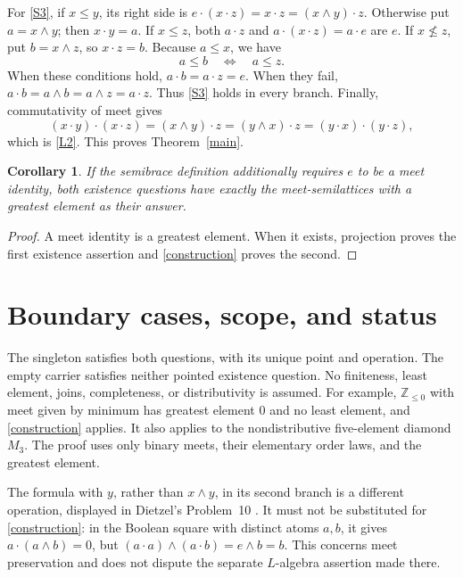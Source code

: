 \documentclass[11pt]{article}
\newtheorem{corollary}[theorem]{Corollary}
\newcommand{\meet}{\wedge}
\newcommand{\dotop}{\mathbin{\cdot}}
\begin{document}
For \eqref{S3}, if \(x\leq y\), its right side is
\(e\dotop(x\dotop z)=x\dotop z=(x\meet y)\dotop z\).
Otherwise put \(a=x\meet y\); then \(x\dotop y=a\).
If \(x\leq z\), both \(a\dotop z\) and \(a\dotop(x\dotop z)=a\dotop e\)
are \(e\). If \(x\not\leq z\), put \(b=x\meet z\), so \(x\dotop z=b\).
Because \(a\leq x\), we have
\[
a\leq b\quad\Longleftrightarrow\quad a\leq z.
\]
When these conditions hold, \(a\dotop b=a\dotop z=e\).
When they fail, \(a\dotop b=a\meet b=a\meet z=a\dotop z\).
Thus \eqref{S3} holds in every branch. Finally, commutativity of meet gives
\[
(x\dotop y)\dotop(x\dotop z)
=(x\meet y)\dotop z
=(y\meet x)\dotop z
=(y\dotop x)\dotop(y\dotop z),
\]
which is \eqref{L2}. This proves Theorem~\ref{main}.

\begin{corollary}
If the semibrace definition additionally requires \(e\) to be a meet
identity, both existence questions have exactly the meet-semilattices with
a greatest element as their answer.
\end{corollary}
\begin{proof}
A meet identity is a greatest element. When it exists, projection proves
the first existence assertion and \eqref{construction} proves the second.
\end{proof}

\section{Boundary cases, scope, and status}

The singleton satisfies both questions, with its unique point and operation.
The empty carrier satisfies neither pointed existence question.
No finiteness, least element, joins, completeness, or distributivity is
assumed. For example, \(\mathbb Z_{\leq0}\) with meet given by minimum has
greatest element \(0\) and no least element, and \eqref{construction}
applies. It also applies to the nondistributive five-element diamond
\(M_3\). The proof uses only binary meets, their elementary order laws, and
the greatest element.

The formula with \(y\), rather than \(x\meet y\), in its second branch is
a different operation, displayed in Dietzel's Problem~10
\cite[p.~546]{Dietzel}. It must not be substituted for
\eqref{construction}: in the Boolean square with distinct atoms \(a,b\),
it gives \(a\dotop(a\meet b)=0\), but
\((a\dotop a)\meet(a\dotop b)=e\meet b=b\).
This concerns meet preservation and does not dispute the separate
\(L\)-algebra assertion made there.
\end{document}
